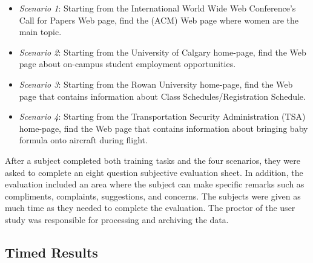 \documentclass[10pt,psfig]{article}
\begin{document}
{\begin{itemize}

\item {\em Scenario 1}: Starting from the International World Wide Web Conference's Call for Papers Web page, find the (ACM) Web page where women are the main topic.

\item {\em Scenario 2}: Starting from the University of Calgary home-page, find the Web page about on-campus student employment opportunities.

\item {\em Scenario 3}: Starting from the Rowan University home-page, find the Web page that contains information about Class Schedules/Registration Schedule.

\item {\em Scenario 4}: Starting from the Transportation Security Administration (TSA) home-page, find the Web page that contains information about bringing baby formula onto aircraft during flight.

\end{itemize}


After a subject completed both training tasks and the four scenarios, they were asked to complete an eight question subjective evaluation sheet.
In addition, the evaluation included an area where the subject can make specific remarks such as compliments, complaints, suggestions, and concerns.
The subjects were given as much time as they needed to complete the evaluation.
The proctor of the user study was responsible for processing and archiving the data.

\subsection{Timed Results}
\label{user_study_results}

\begin{table}[t]
\begin{center}
\begin{tabular}{|c|c|c|c|c|c|c|} \hline


\end{tabular}
\end{center}
\end{table}}
\end{document}
